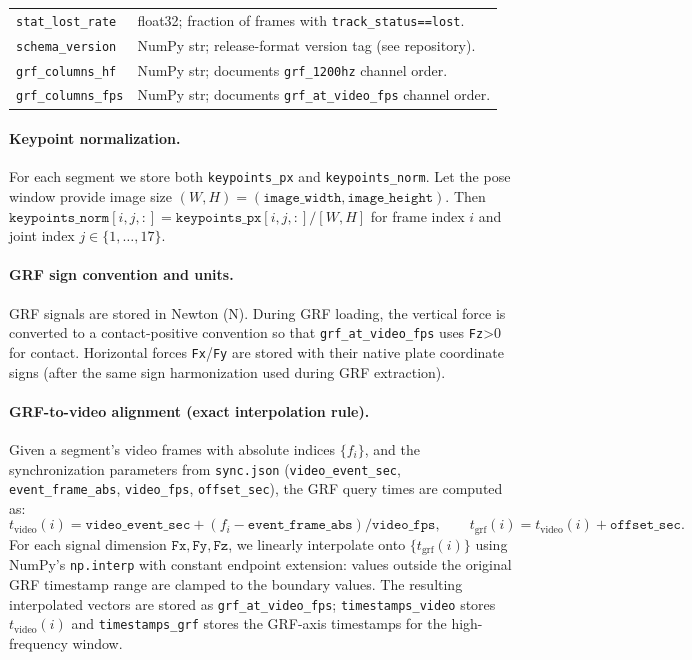 \documentclass[sigconf,screen]{acmart}
\begin{document}
\begin{table}[t]
\begin{tabularx}{\columnwidth}{@{}lX@{}}
    \texttt{stat\_lost\_rate} & float32; fraction of frames with \texttt{track\_status==lost}. \\
    \texttt{schema\_version} & NumPy str; release-format version tag (see repository). \\
    \texttt{grf\_columns\_hf} & NumPy str; documents \texttt{grf\_1200hz} channel order. \\
    \texttt{grf\_columns\_fps} & NumPy str; documents \texttt{grf\_at\_video\_fps} channel order. \\
    \bottomrule
  \end{tabularx}
\end{table}

\paragraph{Keypoint normalization.}
For each segment we store both \texttt{keypoints\_px} and \texttt{keypoints\_norm}.
Let the pose window provide image size \((W,H)=(\texttt{image\_width},\texttt{image\_height})\).
Then \(\texttt{keypoints\_norm}[i,j,:]=\texttt{keypoints\_px}[i,j,:]/[W,H]\) for frame index \(i\) and joint index \(j\in\{1,\dots,17\}\).

\paragraph{GRF sign convention and units.}
GRF signals are stored in Newton (N).
During GRF loading, the vertical force is converted to a contact-positive convention so that \texttt{grf\_at\_video\_fps} uses \texttt{Fz}>0 for contact.
Horizontal forces \texttt{Fx}/\texttt{Fy} are stored with their native plate coordinate signs (after the same sign harmonization used during GRF extraction).

\paragraph{GRF-to-video alignment (exact interpolation rule).}
Given a segment's video frames with absolute indices \(\{f_i\}\), and the synchronization parameters from \texttt{sync.json}
(\texttt{video\_event\_sec}, \texttt{event\_frame\_abs}, \texttt{video\_fps}, \texttt{offset\_sec}),
the GRF query times are computed as:
\[
 t_{\text{video}}(i)=\texttt{video\_event\_sec} + (f_i-\texttt{event\_frame\_abs})/\texttt{video\_fps},
 \qquad
 t_{\text{grf}}(i)=t_{\text{video}}(i)+\texttt{offset\_sec}.
 \]
For each signal dimension \(\texttt{Fx},\texttt{Fy},\texttt{Fz}\), we linearly interpolate onto \(\{t_{\text{grf}}(i)\}\) using NumPy's
\texttt{np.interp} with constant endpoint extension:
values outside the original GRF timestamp range are clamped to the boundary values.
The resulting interpolated vectors are stored as \texttt{grf\_at\_video\_fps}; \texttt{timestamps\_video} stores \(t_{\text{video}}(i)\) and \texttt{timestamps\_grf} stores the GRF-axis timestamps for the high-frequency window.
\end{document}

